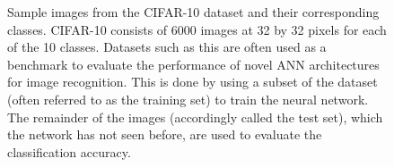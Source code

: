 \begin{figure}
    \centering
{}
\caption[CIFAR-10 classes and sample images]{Sample images from the CIFAR-10 \cite{cifar10} dataset and their corresponding classes. CIFAR-10 consists of 6000 images at 32 by 32 pixels for each of the 10 classes. Datasets such as this are often used as a benchmark to evaluate the performance of novel ANN architectures for image recognition. This is done by using a subset of the dataset (often referred to as the training set) to train the neural network. The remainder of the images (accordingly called the test set), which the network has not seen before, are used to evaluate the classification accuracy.}\label{fig:cifar10}
\end{figure}\noindent
